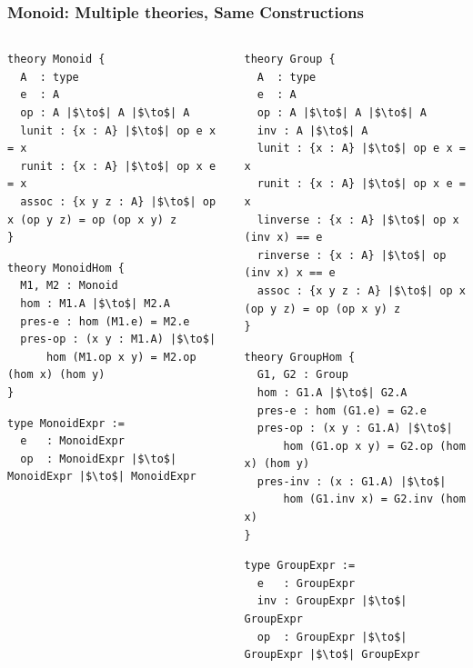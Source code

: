 \documentclass[t,10pt,numbers,fleqn,usenames,xcolor=dvipsnames]{beamer}
\begin{document}
\begin{frame}[fragile]
\frametitle{Monoid: Multiple theories, Same Constructions}
\begin{columns}
    \begin{column}{0.45\textwidth}
        \begin{verbatim}
theory Monoid { 
  A  : type 
  e  : A
  op : A |$\to$| A |$\to$| A
  lunit : {x : A} |$\to$| op e x = x 
  runit : {x : A} |$\to$| op x e = x 
  assoc : {x y z : A} |$\to$| op x (op y z) = op (op x y) z
}
         \end{verbatim} 
\vspace{0.65cm}
        \begin{verbatim}
theory MonoidHom { 
  M1, M2 : Monoid  
  hom : M1.A |$\to$| M2.A 
  pres-e : hom (M1.e) = M2.e
  pres-op : (x y : M1.A) |$\to$| 
      hom (M1.op x y) = M2.op (hom x) (hom y) 
}             
          \end{verbatim} 
\vspace{0.35cm}          
\begin{verbatim}  
type MonoidExpr := 
  e   : MonoidExpr 
  op  : MonoidExpr |$\to$| MonoidExpr |$\to$| MonoidExpr
\end{verbatim}            
     \end{column} 
     \begin{column}{0.45\textwidth}
     
        \begin{verbatim}
theory Group {
  A  : type 
  e  : A
  op : A |$\to$| A |$\to$| A
  inv : A |$\to$| A
  lunit : {x : A} |$\to$| op e x = x
  runit : {x : A} |$\to$| op x e = x
  linverse : {x : A} |$\to$| op x (inv x) == e
  rinverse : {x : A} |$\to$| op (inv x) x == e
  assoc : {x y z : A} |$\to$| op x (op y z) = op (op x y) z 
}
        \end{verbatim}     
\begin{verbatim}  
theory GroupHom { 
  G1, G2 : Group 
  hom : G1.A |$\to$| G2.A
  pres-e : hom (G1.e) = G2.e
  pres-op : (x y : G1.A) |$\to$| 
      hom (G1.op x y) = G2.op (hom x) (hom y)
  pres-inv : (x : G1.A) |$\to$| 
      hom (G1.inv x) = G2.inv (hom x)  
}
\end{verbatim}  
\begin{verbatim}  
type GroupExpr := 
  e   : GroupExpr 
  inv : GroupExpr |$\to$| GroupExpr
  op  : GroupExpr |$\to$| GroupExpr |$\to$| GroupExpr
\end{verbatim}           
\end{column}
\end{columns} 
\end{frame}
\end{document}
